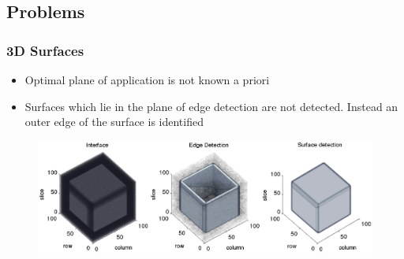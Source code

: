 \documentclass[9pt]{beamer}
\begin{document}
\subsection{Problems}
\begin{frame}
		\frametitle{3D Surfaces}
				\begin{itemize}
					\item Optimal plane of application is not known a priori
					\item Surfaces which lie in the plane of edge detection are not detected. Instead an outer edge of the surface is identified
				\end{itemize}
				\begin{flushright}
						\begin{figure}
									\includegraphics[scale=0.45]{fail2d}
							\end{figure}
				\end{flushright}
\end{frame}
\end{document}
